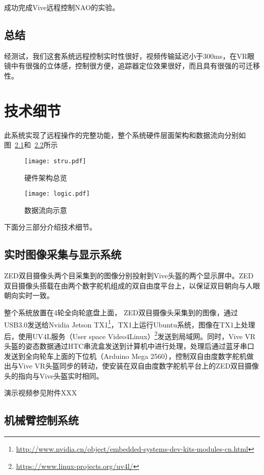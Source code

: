 成功完成Vive远程控制NAO的实验。



\section{总结}

经测试，我们这套系统远程控制实时性很好，视频传输延迟小于300ms，在VR眼镜中有很强的立体感，控制很方便，追踪器定位效果很好，而且具有很强的可迁移性。



\chapter{技术细节}

此系统实现了远程操作的完整功能，整个系统硬件层面架构和数据流向分别如图~\ref{stru}和~\ref{logic}所示

\begin{figure}[htbp]
\small
\centering
\texttt{[image: stru.pdf]}
\caption{硬件架构总览} 
\label{stru}
\end{figure}

\begin{figure}[htbp]
\small
\centering
\texttt{[image: logic.pdf]}
\caption{数据流向示意} 
\label{logic}
\end{figure}

下面分三部分介绍技术细节。

\section{实时图像采集与显示系统}
ZED双目摄像头两个目采集到的图像分别投射到Vive头盔的两个显示屏中。ZED双目摄像头搭载在由两个数字舵机组成的双自由度平台上，以保证双目朝向与人眼朝向实时一致。

整个系统放置在4轮全向轮底盘上面， ZED双目摄像头采集到的图像，通过USB3.0发送给Nvidia Jetson TX1\footnote{\url{http://www.nvidia.cn/object/embedded-systems-dev-kits-modules-cn.html}}，TX1上运行Ubuntu系统，图像在TX1上处理后，使用UV4L服务（User space Video4Linux）\footnote{\url{https://www.linux-projects.org/uv4l/}}发送到局域网。同时，Vive VR头盔的姿态数据通过HTC串流盒发送到计算机中进行处理，处理后通过蓝牙串口发送到全向轮车上面的下位机（Arduino Mega 2560），控制双自由度数字舵机做出与Vive VR头盔同步的转动，使安装在双自由度数字舵机平台上的ZED双目摄像头的指向与Vive头盔实时相同。


演示视频参见附件XXX


\section{机械臂控制系统}

